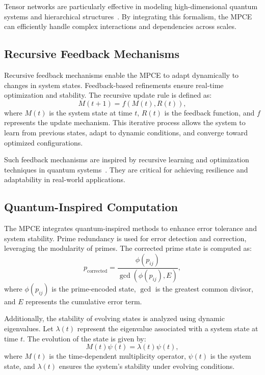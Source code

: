 \documentclass{article}
\theoremstyle{plain}
\begin{document}
Tensor networks are particularly effective in modeling high-dimensional quantum systems and hierarchical structures~\cite{vidal2003efficient, white1992tensor}. By integrating this formalism, the MPCE can efficiently handle complex interactions and dependencies across scales.

\subsection{Recursive Feedback Mechanisms}

Recursive feedback mechanisms enable the MPCE to adapt dynamically to changes in system states. Feedback-based refinements ensure real-time optimization and stability. The recursive update rule is defined as:
\begin{equation}
    M(t+1) = f(M(t), R(t)),
\end{equation}
where \( M(t) \) is the system state at time \( t \), \( R(t) \) is the feedback function, and \( f \) represents the update mechanism. This iterative process allows the system to learn from previous states, adapt to dynamic conditions, and converge toward optimized configurations.

Such feedback mechanisms are inspired by recursive learning and optimization techniques in quantum systems~\cite{shor1994algorithms, grover1996fast}. They are critical for achieving resilience and adaptability in real-world applications.

\subsection{Quantum-Inspired Computation}

The MPCE integrates quantum-inspired methods to enhance error tolerance and system stability. Prime redundancy is used for error detection and correction, leveraging the modularity of primes. The corrected prime state is computed as:
\begin{equation}
    p_{\text{corrected}} = \frac{\phi(p_{ij})}{\gcd(\phi(p_{ij}), E)},
\end{equation}
where \( \phi(p_{ij}) \) is the prime-encoded state, \( \gcd \) is the greatest common divisor, and \( E \) represents the cumulative error term.

Additionally, the stability of evolving states is analyzed using dynamic eigenvalues. Let \( \lambda(t) \) represent the eigenvalue associated with a system state at time \( t \). The evolution of the state is given by:
\begin{equation}
    M(t) \psi(t) = \lambda(t) \psi(t),
\end{equation}
where \( M(t) \) is the time-dependent multiplicity operator, \( \psi(t) \) is the system state, and \( \lambda(t) \) ensures the system's stability under evolving conditions.
\end{document}
